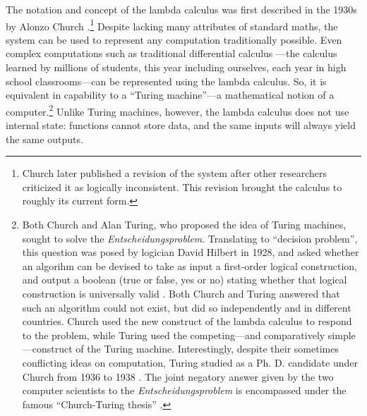 \documentclass[twocolumn,titlepage,12pt]{article}
\begin{document}
The notation and concept of the lambda calculus was first described in the 1930s by Alonzo Church \cite{church}.\footnote{Church later published a revision \cite{church2} of the system after other researchers\cite{logicallyinconsistent} criticized it as logically inconsistent. This revision brought the calculus to roughly its current form.} Despite lacking many attributes of standard maths, the system can be used to represent any computation traditionally possible. Even complex computations such as traditional differential calculus \cite{differentiallc}---the calculus learned by millions of students, this year including ourselves, each year in high school classrooms---can be represented using the lambda calculus. So, it is equivalent in capability to a ``Turing machine''---a mathematical notion of a computer.\footnote{Both Church and Alan Turing, who proposed the idea of Turing machines, sought to solve the \textit{Entscheidungsproblem}. Translating to ``decision problem'', this question was posed by logician David Hilbert in 1928, and asked whether an algorihm can be devised to take as input a first-order logical construction, and output a boolean (true or false, yes or no) stating whether that logical construction is universally valid \cite{hilbert}. Both Church and Turing answered that such an algorithm could not exist, but did so independently and in different countries. Church used the new construct of the lambda calculus to respond to the problem, while Turing used the competing---and comparatively simple---construct of the Turing machine. Interestingly, despite their sometimes conflicting ideas on computation, Turing studied as a Ph. D. candidate under Church from 1936 to 1938 \cite{churchpapers}. The joint negatory answer given by the two computer scientists to the \textit{Entscheidungsproblem} is encompassed under the famous ``Church-Turing thesis'' \cite{churchturingthesis}.} Unlike Turing machines, however, the lambda calculus does not use internal state: functions cannot store data, and the same inputs will always yield the same outputs.
\end{document}
